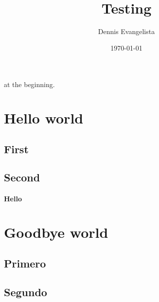\documentclass[nols]{tufte-handout}
\title{Testing}
\author{Dennis Evangelista}
\date{\today}
\begin{document}
\maketitle

 at the beginning. %

\section{Hello world}
\lipsum[1][1]

\subsection{First}
\lipsum[1][2]

\subsection{Second}
\lipsum[1][3]

\paragraph{Hello} \lipsum[1][4]

\section{Goodbye world}
\lipsum[2][1]

\subsection{Primero}
\lipsum[2][2]

\subsection{Segundo}
\lipsum[2][3]

\begin{fullwidth}
\small\itshape\lipsum[1]
\end{fullwidth}
\end{document}
